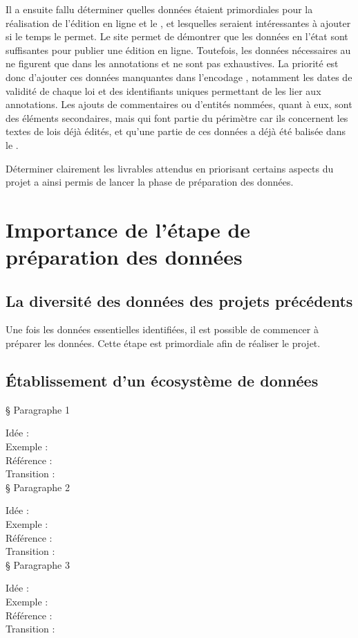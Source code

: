 Il a ensuite fallu déterminer quelles données étaient primordiales pour la réalisation de l'édition en ligne et le \cv, et lesquelles seraient intéressantes à ajouter si le temps le permet. Le site \LSC permet de démontrer que les données en l'état sont suffisantes pour publier une édition en ligne. Toutefois, les données nécessaires au \cv ne figurent que dans les annotations et ne sont pas exhaustives. La priorité est donc d'ajouter ces données manquantes dans l'encodage \TEI, notamment les dates de validité de chaque loi et des identifiants uniques permettant de les lier aux annotations. Les ajouts de commentaires ou d'entités nommées, quant à eux, sont des éléments secondaires, mais qui font partie du périmètre car ils concernent les textes de lois déjà édités, et qu'une partie de ces données a déjà été balisée dans le \XML. 

Déterminer clairement les livrables attendus en priorisant certains aspects du projet a ainsi permis de lancer la phase de préparation des données. 

 \section{Importance de l’étape de préparation des données}
    \subsection{La diversité des données des projets précédents}

Une fois les données essentielles identifiées, il est possible de commencer à préparer les données. Cette étape est primordiale afin de réaliser le projet. 

\subsection{Établissement d’un écosystème de données}

§ Paragraphe 1

Idée :\\
Exemple :\\
Référence :\\
Transition :\\

§ Paragraphe 2

Idée :\\
Exemple :\\
Référence :\\
Transition :\\

§ Paragraphe 3

Idée :\\
Exemple :\\
Référence :\\
Transition :\\

